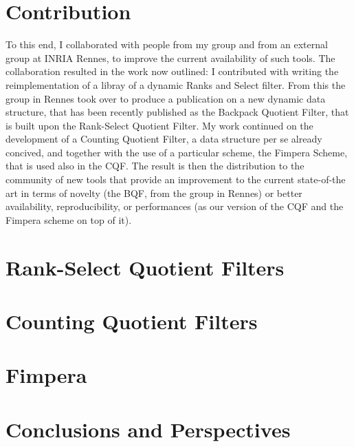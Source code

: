 \section{Contribution}
To this end, I collaborated with people from my group and from an external group at INRIA Rennes, to improve the current availability of such tools. The collaboration resulted in the work now outlined: I contributed with writing the reimplementation of a libray of a dynamic Ranks and Select filter. From this the group in Rennes took over to produce a publication on a new dynamic data structure, that has been recently published as the Backpack Quotient Filter, that is built upon the Rank-Select Quotient Filter. My work continued on the development of a Counting Quotient Filter, a data structure per se already concived, and together with the use of a particular scheme, the Fimpera Scheme, that is used also in the CQF.
The result is then the distribution to the community of new tools that provide an improvement to the current state-of-the art in terms of novelty (the BQF, from the group in Rennes) or better availability, reproducibility, or performances (as our version of the CQF and the Fimpera scheme on top of it).

\section{Rank-Select Quotient Filters}
\section{Counting Quotient Filters}
\section{Fimpera}
\section{Conclusions and Perspectives}